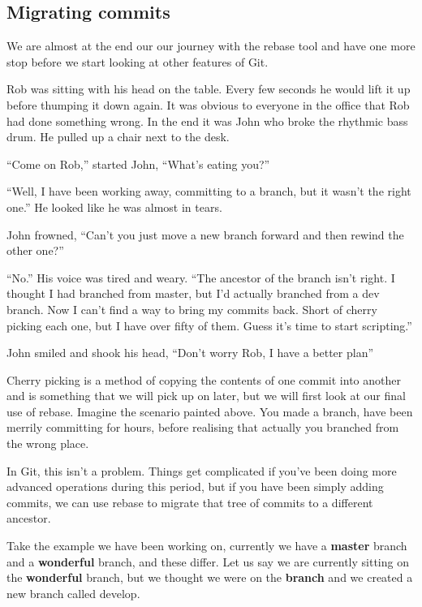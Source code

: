 \subsection{Migrating commits}

We are almost at the end our our journey with the rebase tool and have one more stop before we start looking at other features of Git.

\begin{trenches}
Rob was sitting with his head on the table.
Every few seconds he would lift it up before thumping it down again.
It was obvious to everyone in the office that Rob had done something wrong.
In the end it was John who broke the rhythmic bass drum.
He pulled up a chair next to the desk.

``Come on Rob,'' started John, ``What's eating you?''

``Well, I have been working away, committing to a branch, but it wasn't the right one.''
He looked like he was almost in tears.

John frowned, ``Can't you just move a new branch forward and then rewind the other one?''

``No.'' His voice was tired and weary.
``The ancestor of the branch isn't right. I thought I had branched from master, but I'd actually branched from a dev branch. Now I can't find a way to bring my commits back. Short of cherry picking each one, but I have over fifty of them. Guess it's time to start scripting.''

John smiled and shook his head, ``Don't worry Rob, I have a better plan''
\end{trenches}

Cherry picking is a method of copying the contents of one commit into another and is something that we will pick up on later, but we will first look at our final use of rebase.
Imagine the scenario painted above.
You made a branch, have been merrily committing for hours, before realising that actually you branched from the wrong place.

In Git, this isn't a problem.
Things get complicated if you've been doing more advanced operations during this period, but if you have been simply adding commits, we can use rebase to migrate that tree of commits to a different ancestor.

Take the example we have been working on, currently we have a \textbf{master} branch and a \textbf{wonderful} branch, and these differ.
Let us say we are currently sitting on the \textbf{wonderful} branch, but we thought we were on the \textbf{branch} and we created a new branch called develop.

